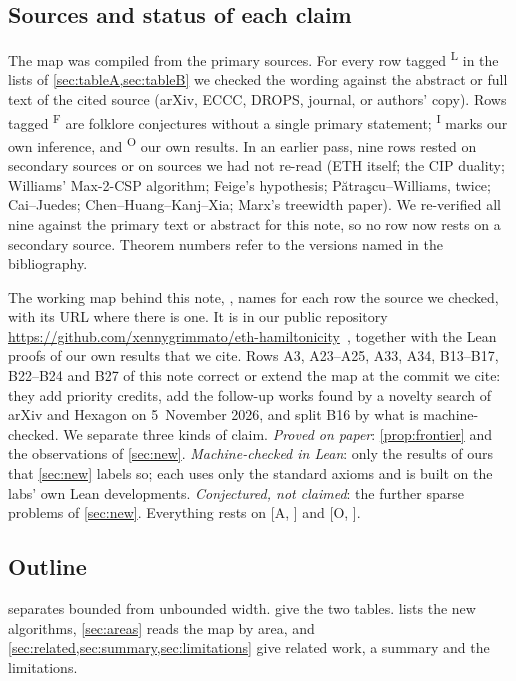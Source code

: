 \documentclass[10pt]{amsart}
\theoremstyle{plain}
\theoremstyle{definition}
\theoremstyle{remark}
\numberwithin{equation}{section}
\newcommand{\A}[1][]{\textup{[A\if\relax\detokenize{#1}\relax\else, #1\fi]}}
\newcommand{\Oa}[1][]{\textup{[O\if\relax\detokenize{#1}\relax\else, #1\fi]}}
\newcommand{\Lit}{\textsuperscript{L}}
\newcommand{\Inf}{\textsuperscript{I}}
\newcommand{\Fol}{\textsuperscript{F}}
\newcommand{\Own}{\textsuperscript{O}}
\begin{document}
\subsection{Sources and status of each claim}\label{sec:sources}
The map was compiled from the primary sources. For every row tagged \Lit{} in
the lists of \cref{sec:tableA,sec:tableB} we checked the wording against the abstract or full text of the cited
source (arXiv, ECCC, DROPS, journal, or authors' copy). Rows tagged \Fol{} are folklore
conjectures without a single primary statement; \Inf{} marks our own inference, and \Own{} our own
results. In an earlier pass, nine rows rested on secondary sources or on sources we had not
re-read (ETH itself; the CIP duality; Williams' Max-2-CSP algorithm; Feige's hypothesis;
P\u{a}tra\c{s}cu--Williams, twice; Cai--Juedes; Chen--Huang--Kanj--Xia; Marx's treewidth paper).
We re-verified all nine against the primary text or abstract for this note, so no row now rests on
a secondary source. Theorem numbers refer to the versions named in the bibliography.

The working map behind this note, , names for each row the source
we checked, with its URL where there is one. It is in our public repository
\url{https://github.com/xennygrimmato/eth-hamiltonicity}~\cite{TulsyanRepo26}, together with the
Lean proofs of our own results that we cite. Rows A3, A23--A25, A33, A34, B13--B17, B22--B24 and
B27 of this note correct or extend the map at the commit we cite: they add priority credits, add
the follow-up works found by a novelty search of arXiv and Hexagon on 5~November 2026, and split
B16 by what is machine-checked. We separate three kinds of claim. \emph{Proved on
paper}: \cref{prop:frontier} and the observations of \cref{sec:new}. \emph{Machine-checked in
Lean}: only the results of ours that \cref{sec:new} labels so; each uses only the standard axioms
and is built on the labs' own Lean developments. \emph{Conjectured, not claimed}: the further
sparse problems of \cref{sec:new}. Everything rests on \A{} and \Oa.

\subsection*{Outline}
 separates bounded from unbounded width.  give the two
tables.  lists the new algorithms, \cref{sec:areas} reads the map by area, and
\cref{sec:related,sec:summary,sec:limitations} give related work, a summary and the limitations.
\end{document}
